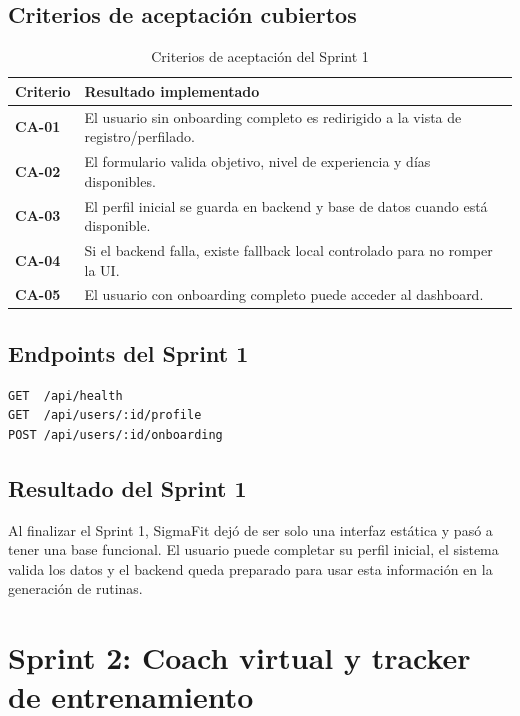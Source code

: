 \documentclass[12pt,a4paper]{article}
\begin{document}
\subsection{Criterios de aceptación cubiertos}

\begin{table}[H]
\centering
\caption{Criterios de aceptación del Sprint 1}
\renewcommand{\arraystretch}{1.3}
\begin{tabularx}{\textwidth}{>{\bfseries}p{3cm} X}
\toprule
Criterio & Resultado implementado \\
\midrule
CA-01 & El usuario sin onboarding completo es redirigido a la vista de registro/perfilado. \\
CA-02 & El formulario valida objetivo, nivel de experiencia y días disponibles. \\
CA-03 & El perfil inicial se guarda en backend y base de datos cuando está disponible. \\
CA-04 & Si el backend falla, existe fallback local controlado para no romper la UI. \\
CA-05 & El usuario con onboarding completo puede acceder al dashboard. \\
\bottomrule
\end{tabularx}
\end{table}

\subsection{Endpoints del Sprint 1}

\begin{lstlisting}
GET  /api/health
GET  /api/users/:id/profile
POST /api/users/:id/onboarding
\end{lstlisting}

\subsection{Resultado del Sprint 1}

Al finalizar el Sprint 1, SigmaFit dejó de ser solo una interfaz estática y pasó a tener una base funcional. El usuario puede completar su perfil inicial, el sistema valida los datos y el backend queda preparado para usar esta información en la generación de rutinas.

\section{Sprint 2: Coach virtual y tracker de entrenamiento}
\end{document}
